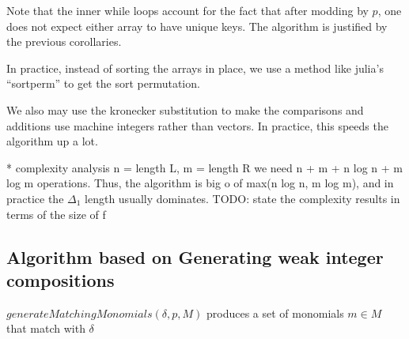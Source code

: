 %
%
%
%
%
%
%
%
%
%

Note that the inner while loops account for the fact that
after modding by \(p\), one does not expect 
either array to have unique keys.
The algorithm is justified by the previous corollaries.

In practice, instead of sorting the arrays in place, 
we use a method like julia's ``sortperm''
to get the sort permutation.

We also may use the kronecker substitution to make
the comparisons and additions use machine integers
rather than vectors.
In practice, this speeds the algorithm up a lot.

* complexity analysis
n = length L, m = length R
we need n + m + n log n + m log m operations.
Thus, the algorithm is big o of max(n log n, m log m),
and in practice the \(\Delta_{1}\) length
usually dominates.
TODO: state the complexity results in terms of the size of f


\subsection{Algorithm based on Generating weak integer compositions}

\begin{defn}
    $generateMatchingMonomials(\delta, p, M)$ produces a set of monomials $m \in M$ that match with $\delta$
\end{defn}

